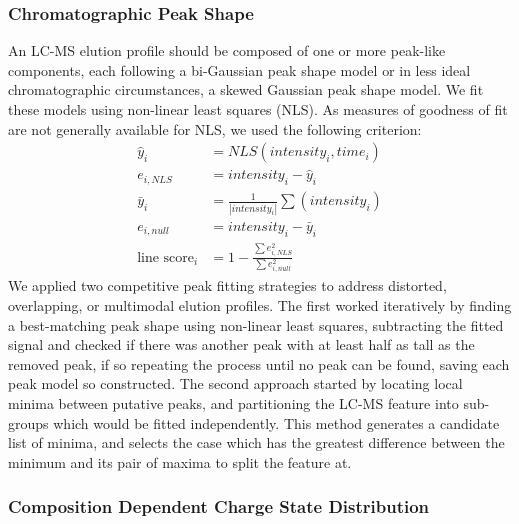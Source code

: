 \documentclass{article}
\begin{document}
\subsubsection{Chromatographic Peak Shape}
An LC-MS elution profile should be composed of one or more peak-like components, each
following a bi-Gaussian peak shape model \cite{Yu2010} or in less ideal chromatographic
circumstances, a skewed Gaussian peak shape model. We fit these models using non-linear
least squares (NLS). As measures of goodness of fit are not generally available for NLS,
we used the following criterion:\begin{align}
    {\hat y_i} &= NLS(intensity_i, time_i) \\
    e_{i, NLS} &= intensity_i - {\hat y_i} \\
    {\bar y_i} &= \frac{1}{|intensity_i|}\sum(intensity_i) \\
    e_{i, null} &= intensity_i - {\bar y_i} \\
    \text{line score}_i &= 1 - \frac{\sum{e_{i, NLS}^2}}{\sum{e_{i, null}^2}}
\end{align}
We applied two competitive peak fitting strategies to address distorted, overlapping, or
multimodal elution profiles. The first worked iteratively by finding a best-matching peak
shape using non-linear least squares, subtracting the fitted signal and checked if there was
another peak with at least half as tall as the removed peak, if so repeating the process until
no peak can be found, saving each peak model so constructed. The second approach started
by locating local minima between putative peaks, and partitioning the LC-MS feature into
sub-groups which would be fitted independently. This method generates a candidate list of
minima, and selects the case which has the greatest difference between the minimum and its
pair of maxima to split the feature at.

\subsubsection{Composition Dependent Charge State Distribution}




\end{document}
